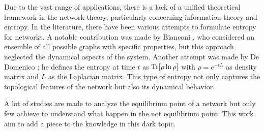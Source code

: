 Due to the vast range of applications, there is a lack of a unified theoretical framework in the network theory, particularly concerning information theory and entropy. 
In the literature, there have been various attempts to formulate entropy for networks. A notable contribution was made by Bianconi \cite{Bianconi_entropy_1}\cite{Bianconi_entropy_2}, who considered an ensemble of all possible graphs with specific properties, but this approach neglected the dynamical aspects of the system.
Another attempt was made by De Domenico \cite{De_Domenico_2016}; he defines the entropy at time $t$ as $\operatorname{Tr}[\rho \ln \rho]$ with $\rho = e^{-tL}$ as density matrix and $L$ as the Laplacian matrix. This type of entropy not only captures the topological features of the network but also its dynamical behavior.



A lot of studies are made to analyze the equilibrium point of a network but only few achieve to understand what happen in the not equilibrium point. This work aim to add a piece to the knowledge in this dark topic.
